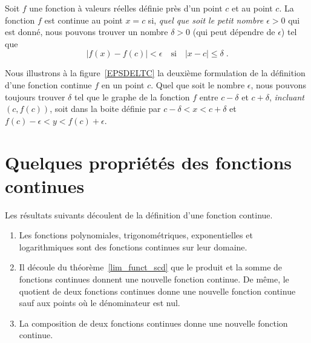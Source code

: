 {\begin{defn} 
Soit $f$ une fonction à valeurs réelles définie près d'un point $c$ et
au point $c$.  La fonction $f$ est continue au point $x=c$ si,
{\em quel que soit le petit nombre $\epsilon >0$} qui est donné, nous
pouvons trouver un nombre $\delta >0$ (qui peut dépendre de $\epsilon$)
tel que
\[
|f(x) - f(c)| < \epsilon \quad \text{si} \quad |x-c|\leq \delta \; .
\]
\end{defn}

\begin{rmk}
Nous illustrons à la figure~\ref{EPSDELTC} la deuxième formulation de la
définition d'une fonction continue $f$ en un point $c$.  Quel que soit
le nombre $\epsilon$, nous pouvons toujours trouver $\delta$ tel que le
graphe de la fonction $f$ entre $c-\delta$ et $c+\delta$,
{\em incluant $(c,f(c))$}, soit dans la boite définie par
$c-\delta < x < c+\delta$ et $f(c)-\epsilon < y < f(c)+\epsilon$.
\end{rmk}


\section{Quelques propriétés des fonctions continues}

Les résultats suivants découlent de la définition d'une fonction continue.

\begin{prop}
\begin{enumerate}
\item Les fonctions polynomiales, trigonométriques, exponentielles et
  logarithmiques sont des fonctions continues sur leur domaine.
\item Il découle du théorème~\ref{lim_funct_scd} que le produit et la
  somme de fonctions continues donnent une nouvelle fonction continue.
  De même, le quotient de deux fonctions continues donne une nouvelle
  fonction continue sauf aux points où le dénominateur est nul.
\item La composition de deux fonctions continues donne une nouvelle
  fonction continue.
\end{enumerate}
\end{prop}

}
